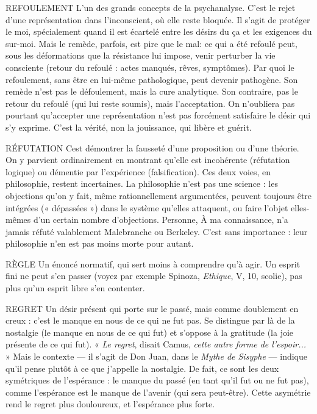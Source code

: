 REFOULEMENT L'un des grands concepts de la psychanalyse. C’est le rejet
d’une représentation dans l’inconscient, où elle reste bloquée.
Il s’agit de protéger le moi, spécialement quand il est écartelé entre les
désirs du ça et les exigences du sur-moi. Mais le remède, parfois, est pire que le
mal: ce qui a été refoulé peut, sous les déformations que la résistance lui
impose, venir perturber la vie consciente (retour du refoulé : actes manqués,
rêves, symptômes). Par quoi le refoulement, sans être en lui-même pathologique,
peut devenir pathogène. Son remède n’est pas le défoulement, mais la
cure analytique. Son contraire, pas le retour du refoulé (qui lui reste soumis),
mais l’acceptation. On n’oubliera pas pourtant qu’accepter une représentation
n’est pas forcément satisfaire le désir qui s’y exprime. C’est la vérité, non la
jouissance, qui libère et guérit.

RÉFUTATION Cest démontrer la fausseté d’une proposition ou d’une
théorie. On y parvient ordinairement en montrant qu’elle
est incohérente (réfutation logique) ou démentie par l'expérience (falsification).
Ces deux voies, en philosophie, restent incertaines. La philosophie n’est pas
une science : les objections qu’on y fait, même rationnellement argumentées,
peuvent toujours être intégrées (« dépassées ») dans le système qu’elles attaquent,
ou faire l’objet elles-mêmes d’un certain nombre d’objections. Personne,
À ma connaissance, n’a jamais réfuté valablement Malebranche ou Berkeley.
C’est sans importance : leur philosophie n’en est pas moins morte pour autant.

RÈGLE Un énoncé normatif, qui sert moins à comprendre qu’à agir. Un
esprit fini ne peut s’en passer (voyez par exemple Spinoza, {\it Ethique},
V, 10, scolie), pas plus qu’un esprit libre s’en contenter.

REGRET Un désir présent qui porte sur le passé, mais comme doublement
en creux : c’est le manque en nous de ce qui ne fut pas. Se distingue
par là de la nostalgie (le manque en nous de ce qui fut) et s'oppose à la
gratitude (la joie présente de ce qui fut). « {\it Le regret}, disait Camus, {\it cette autre
forme de l'espoir...} » Mais le contexte — il s’agit de Don Juan, dans le {\it Mythe de
Sisyphe} — indique qu’il pense plutôt à ce que j'appelle la nostalgie. De fait, ce
sont les deux symétriques de l’espérance : le manque du passé (en tant qu’il fut
ou ne fut pas), comme l’espérance est le manque de l'avenir (qui sera peut-être).
Cette asymétrie rend le regret plus douloureux, et l’espérance plus forte.

